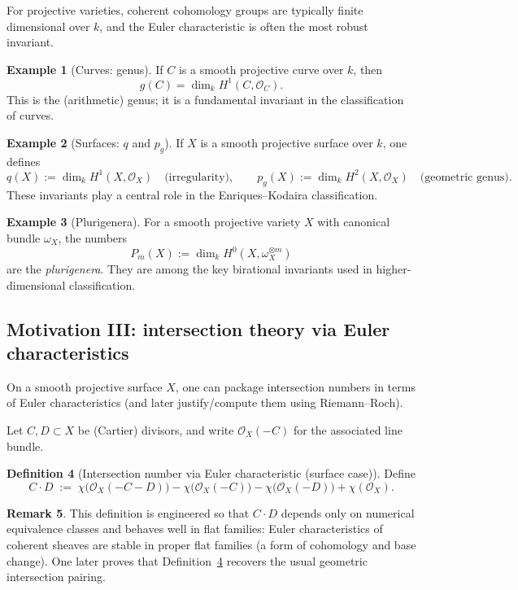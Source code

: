 \documentclass[11pt]{article}
\theoremstyle{definition}
\newtheorem{definition}{Definition}[section]
\newtheorem{example}[definition]{Example}
\newtheorem{remark}[definition]{Remark}
\theoremstyle{plain}
\newcommand{\OO}{\mathcal{O}}
\begin{document}
For projective varieties, coherent cohomology groups are typically finite dimensional over $k$, and the Euler characteristic is often the most robust invariant.

\begin{example}[Curves: genus]
If $C$ is a smooth projective curve over $k$, then
\[
g(C) = \dim_k H^1(C,\OO_C).
\]
This is the (arithmetic) genus; it is a fundamental invariant in the classification of curves.
\end{example}

\begin{example}[Surfaces: $q$ and $p_g$]
If $X$ is a smooth projective surface over $k$, one defines
\[
q(X):=\dim_k H^1(X,\OO_X)\quad\text{(irregularity)},\qquad
p_g(X):=\dim_k H^2(X,\OO_X)\quad\text{(geometric genus)}.
\]
These invariants play a central role in the Enriques--Kodaira classification.
\end{example}

\begin{example}[Plurigenera]
For a smooth projective variety $X$ with canonical bundle $\omega_X$, the numbers
\[
P_m(X):=\dim_k H^0(X,\omega_X^{\otimes m})
\]
are the \emph{plurigenera}. They are among the key birational invariants used in higher-dimensional classification.
\end{example}

\subsection{Motivation III: intersection theory via Euler characteristics}

On a smooth projective surface $X$, one can package intersection numbers in terms of Euler characteristics (and later justify/compute them using Riemann--Roch).

Let $C,D\subset X$ be (Cartier) divisors, and write $\OO_X(-C)$ for the associated line bundle.

\begin{definition}[Intersection number via Euler characteristic (surface case)]\label{def:intersection}
Define
\[
C\cdot D
\;:=\;
\chi\!\bigl(\OO_X(-C-D)\bigr)
-\chi\!\bigl(\OO_X(-C)\bigr)
-\chi\!\bigl(\OO_X(-D)\bigr)
+\chi(\OO_X).
\]
\end{definition}

\begin{remark}
This definition is engineered so that $C\cdot D$ depends only on numerical equivalence classes and behaves well in flat families: Euler characteristics of coherent sheaves are stable in proper flat families (a form of cohomology and base change). One later proves that Definition~\ref{def:intersection} recovers the usual geometric intersection pairing.
\end{remark}
\end{document}
